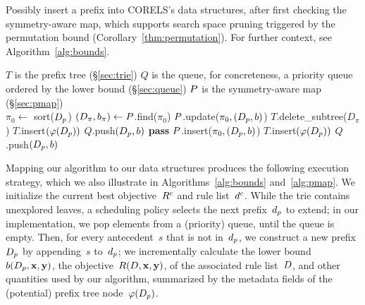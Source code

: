 \begin{algorithm}[t!]
  \caption{Possibly insert a prefix into CORELS's data structures, after first
  checking the symmetry-aware map, which supports search space pruning
  triggered by the permutation bound (Corollary~\ref{thm:permutation}).
  For further context, see Algorithm~\ref{alg:bounds}.}
\label{alg:pmap}
\begin{algorithmic}
\State $T$ is the prefix tree (\S\ref{sec:trie})
\State $Q$ is the queue, for concreteness, a priority queue ordered by the lower bound (\S\ref{sec:queue})
\State $P$ is the symmetry-aware map (\S\ref{sec:pmap}) \\

    \State $\pi_0 \gets$ sort($D_p$) 
    \State $(D_\pi, b_\pi) \gets P$.find($\pi_0$) 
         
            \State $P$.update($\pi_0, (D_p, b)$) 
            \State $T$.delete\_subtree($D_\pi$) 
            \State $T$.insert$(\varphi(D_p))$ 
            \State $Q$.push$(D_p, b)$ 
        \Else
            \State \textbf{pass} 
        \EndIf
    \Else
        \State $P$.insert($\pi_0, (D_p, b)$) 
        \State $T$.insert$(\varphi(D_p))$ 
        \State $Q$.push$(D_p, b)$ 
    \EndIf
\EndFunction
\end{algorithmic}
\end{algorithm}

Mapping our algorithm to our data structures produces the following execution strategy,
which we also illustrate in Algorithms~\ref{alg:bounds} and~\ref{alg:pmap}.
%
We initialize the current best objective~${R^c}$ and rule list~$d^c$.
%
While the trie contains unexplored leaves, a scheduling policy selects the next prefix~$d_p$
to extend; in our implementation, we pop elements from a (priority) queue, until the queue is empty.
%
Then, for every antecedent~$s$ that is not in~$d_p$,
we construct a new prefix~$D_p$ by appending~$s$ to~$d_p$;
we incrementally calculate the lower bound~$b(D_p, \mathbf{x}, \mathbf{y})$,
the objective~$R({D}, \mathbf{x}, \mathbf{y})$, of the associated rule list~${D}$,
and other quantities used by our algorithm, summarized by the metadata fields of
the (potential) prefix tree node~$\varphi(D_p)$.

